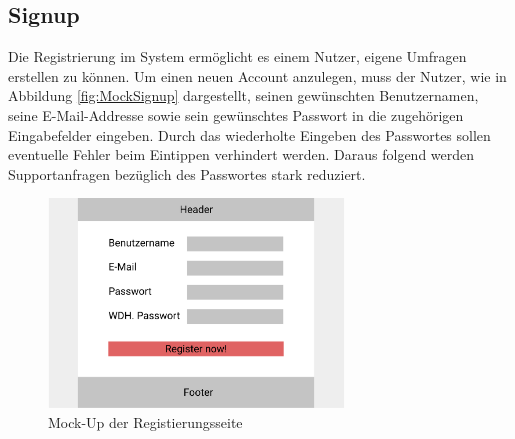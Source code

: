 \subsection{Signup}
\label{ssec:konzept:client:signup}
Die Registrierung im System ermöglicht es einem Nutzer, eigene Umfragen erstellen zu können.
Um einen neuen Account anzulegen, muss der Nutzer, wie in Abbildung \ref{fig:MockSignup} dargestellt, seinen gewünschten Benutzernamen, seine E-Mail-Addresse sowie sein gewünschtes Passwort in die zugehörigen Eingabefelder eingeben.
Durch das wiederholte Eingeben des Passwortes sollen eventuelle Fehler beim Eintippen verhindert werden.
Daraus folgend werden Supportanfragen bezüglich des Passwortes stark reduziert.

\begin{figure}[H]
	\centering
	\includegraphics[width=0.7\textwidth]{img/konzeption/client/register}
	\captionsetup{justification=centering, format=plain}
	\caption[Mock-Up der Registierungsseite]{Mock-Up der Registierungsseite \\\figma}
	\label{fig:MockRegister}
\end{figure}
